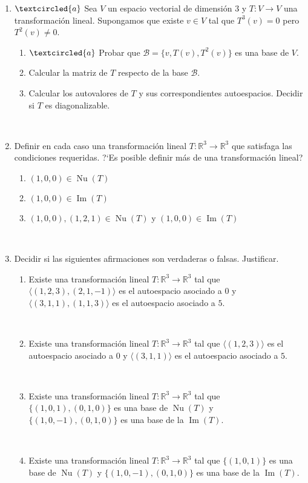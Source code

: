 \documentclass[12pt]{amsart}
\begin{document}
\begin{enumerate}
\

\item\label{base nilp} $\textcircled{a}$ Sea $V$ un espacio vectorial de dimensi\'on $3$ y $T:V\longrightarrow V$ una transformaci\'on lineal. Supongamos que existe $v\in V$ tal que $T^3(v)=0$ pero $T^2(v)\neq0$.
\begin{enumerate}
 \item\label{base nilp a} $\textcircled{a}$ Probar que $\mathcal{B}=\{v,T(v),T^2(v)\}$ es una base de $V$.
 \item Calcular la matriz de $T$ respecto de la base $\mathcal{B}$.
 \item Calcular los autovalores de $T$ y sus correspondientes autoespacios. Decidir si $T$ es diagonalizable.
\end{enumerate}

\
		
\item Definir en cada caso una transformaci\'on lineal $T:\mathbb{R}^3\longrightarrow\mathbb{R}^3$ que satisfaga las condiciones requeridas. ?`Es posible definir m\'as de una transformaci\'on lineal?
\begin{enumerate}
 \item $(1,0,0)\in \operatorname{Nu}(T)$ 
 \item $(1,0,0)\in \operatorname{Im}(T)$ 
 \item $(1,0,0),(1,2,1)\in\operatorname{Nu}(T)$ y $(1,0,0) \in  \operatorname{Im}(T)$
\end{enumerate}

\

\item Decidir si las siguientes afirmaciones son verdaderas o falsas. Justificar. 

\begin{enumerate}
\item Existe una transformaci\'on lineal $T:\mathbb{R}^3\longrightarrow\mathbb{R}^3$ tal que $\langle(1,2,3),(2,1,-1)\rangle$ es el autoespacio asociado a $0$ y $\langle(3,1,1),(1,1,3)\rangle$ es el autoespacio asociado a $5$.

\

\item Existe una transformaci\'on lineal $T:\mathbb{R}^3\longrightarrow\mathbb{R}^3$ tal que $\langle(1,2,3)\rangle$ es el autoespacio asociado a $0$ y $\langle(3,1,1)\rangle$ es el autoespacio asociado a $5$.

\

\item Existe una transformaci\'on lineal $T:\mathbb{R}^3\longrightarrow\mathbb{R}^3$ tal que $\{(1,0,1), (0,1,0)\}$ es una base de $\operatorname{Nu}(T)$ y  $\{(1,0,-1), (0,1,0)\}$ es una base de la $\operatorname{Im}(T)$.
 
 \
 
 \item Existe una transformaci\'on lineal $T:\mathbb{R}^3\longrightarrow\mathbb{R}^3$ tal que $\{(1,0,1)\}$ es una base de $\operatorname{Nu}(T)$ y  $\{(1,0,-1), (0,1,0)\}$ es una base de la $\operatorname{Im}(T)$.
\end{enumerate}




\end{enumerate}
\end{document}
